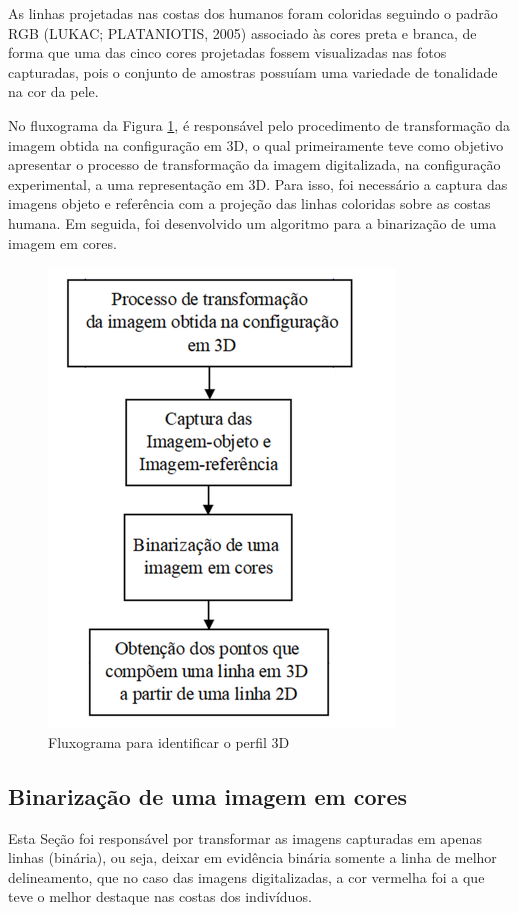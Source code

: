 \documentclass[a4paper, 12pt]{article}
\begin{document}
As linhas projetadas nas costas dos humanos foram coloridas seguindo o padrão RGB (LUKAC; PLATANIOTIS, 2005) associado às cores preta e branca, de forma que uma das cinco cores projetadas fossem visualizadas nas fotos capturadas, pois o conjunto de amostras possuíam uma variedade de tonalidade na cor da pele.

No fluxograma da Figura \ref{fluxograma_identificar_3D}, é responsável pelo procedimento de transformação da imagem obtida na configuração em 3D, o qual primeiramente teve como objetivo apresentar o processo de transformação da imagem digitalizada, na configuração experimental, a uma representação em 3D. Para isso, foi necessário a captura das imagens objeto e referência com a projeção das linhas coloridas sobre as costas humana. Em seguida, foi desenvolvido um algoritmo para a binarização de uma imagem em cores.

\begin{figure}[H]
	\centering
		\includegraphics[scale=0.5]{fluxograma_identificar_3D.png}
	\caption{Fluxograma para identificar o perfil 3D}
	\label{fluxograma_identificar_3D}
\end{figure}

\subsection{Binarização de uma imagem em cores}

Esta Seção foi responsável por transformar as imagens capturadas em apenas linhas (binária), ou seja, deixar em evidência binária somente a linha de melhor delineamento, que no caso das imagens digitalizadas, a cor vermelha foi a que teve o melhor destaque nas costas dos indivíduos.
\end{document}
